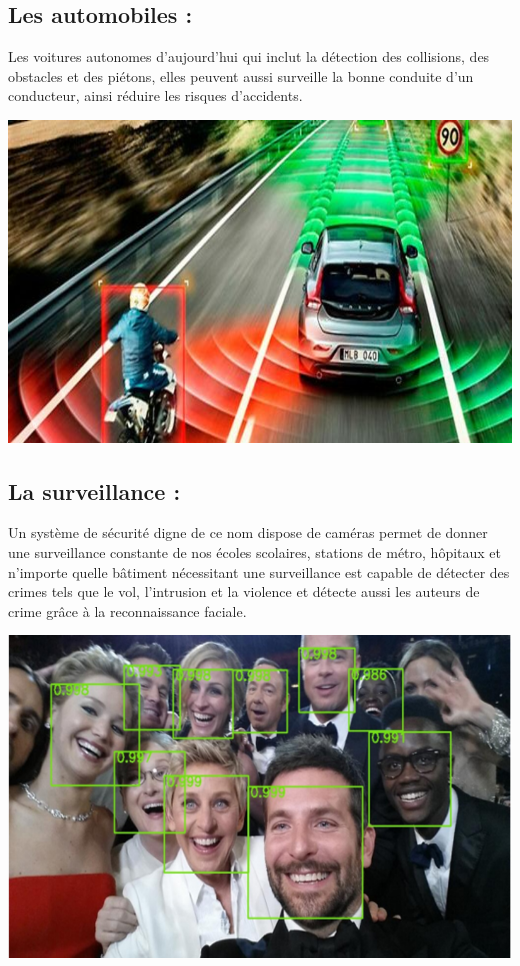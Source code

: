 \subsection{Les automobiles :}
Les voitures autonomes d’aujourd’hui qui inclut la détection des collisions, des obstacles et des piétons, elles  peuvent aussi  surveille la bonne conduite d’un conducteur, ainsi réduire les risques d’accidents.\\
\begin{center}
    \includegraphics[scale=0.25]{img4.png}
    \label{fig2}
\end{center} 
\subsection{La surveillance :}
Un système de sécurité digne de ce nom dispose de caméras permet de donner une surveillance constante de nos écoles scolaires,  stations de métro,  hôpitaux  et n’importe quelle bâtiment nécessitant une surveillance est capable de détecter des crimes tels que le vol, l'intrusion et la violence et détecte aussi les auteurs de crime grâce à la reconnaissance faciale.\\
\begin{center}
    \includegraphics[scale=0.25]{img5.png}
    \label{fig2}
\end{center} 
